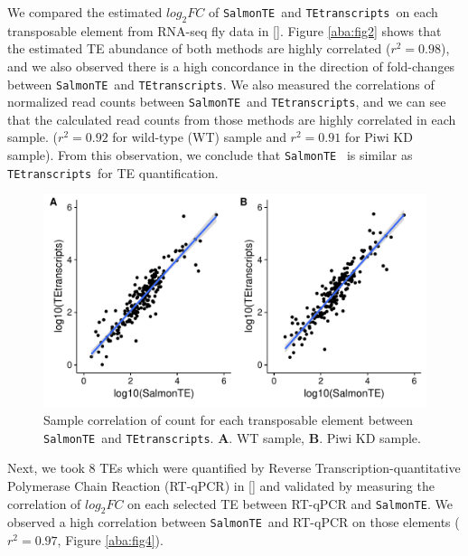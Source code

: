 \documentclass[wsdraft]{ws-procs11x85}
\newcommand{\TEtranscripts}{\texttt{TEtranscripts}}
\newcommand{\SalmonTE}{\texttt{SalmonTE}}
\begin{document}
We compared the estimated $log_{2}FC$ of \SalmonTE~and \TEtranscripts~on each transposable element from 
RNA-seq fly data in [].
Figure \ref{aba:fig2} shows that the estimated TE abundance of both methods are highly correlated ($r^{2}=0.98$), and we also observed there is a high concordance in the direction of fold-changes between \SalmonTE~and \TEtranscripts. We also measured the correlations of normalized read counts between \SalmonTE~and \TEtranscripts, 
and we can see that the calculated read counts from those methods are highly correlated in each sample. ($r^2=0.92$ for wild-type (WT) sample and $r^2=0.91$ for Piwi KD sample).
From this observation, we conclude that \SalmonTE~ is similar as  \TEtranscripts~for TE quantification.

\begin{figure}[h]
\centerline{
\includegraphics[width=13cm]{figure_corr_count}
}
\caption{Sample correlation of count for each transposable element between \SalmonTE~and \TEtranscripts. \textbf{A}. WT sample, \textbf{B}. Piwi KD sample.}
\label{aba:fig3}
\end{figure}

Next, we took 8 TEs which were quantified by
Reverse Transcription-quantitative Polymerase Chain Reaction (RT-qPCR) in []
and validated by measuring the correlation of $log_{2}FC$ on each selected TE between RT-qPCR and \SalmonTE.
We observed a high correlation between \SalmonTE~and RT-qPCR on those elements ($r^2=0.97$, Figure \ref{aba:fig4}). 
\end{document}
